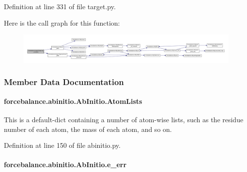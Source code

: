 Definition at line 331 of file target.\-py.



Here is the call graph for this function\-:\nopagebreak
\begin{figure}[H]
\begin{center}
\leavevmode
\includegraphics[width=350pt]{classforcebalance_1_1target_1_1Target_af6099ec09486213869dba2491bd8ea04_cgraph}
\end{center}
\end{figure}




\subsubsection{Member Data Documentation}
\hypertarget{classforcebalance_1_1abinitio_1_1AbInitio_a7e62a74e820ac0c5dd67f49155b95c41}{
\paragraph[{Atom\-Lists}]{\setlength{\rightskip}{0pt plus 5cm}forcebalance.\-abinitio.\-Ab\-Initio.\-Atom\-Lists\hspace{0.3cm}{\ttfamily [inherited]}}}\label{classforcebalance_1_1abinitio_1_1AbInitio_a7e62a74e820ac0c5dd67f49155b95c41}


This is a default-\/dict containing a number of atom-\/wise lists, such as the residue number of each atom, the mass of each atom, and so on. 



Definition at line 150 of file abinitio.\-py.

\hypertarget{classforcebalance_1_1abinitio_1_1AbInitio_aa569290969858e189935b3de37ead3f0}{
\paragraph[{e\-\_\-err}]{\setlength{\rightskip}{0pt plus 5cm}forcebalance.\-abinitio.\-Ab\-Initio.\-e\-\_\-err\hspace{0.3cm}{\ttfamily [inherited]}}}\label{classforcebalance_1_1abinitio_1_1AbInitio_aa569290969858e189935b3de37ead3f0}


